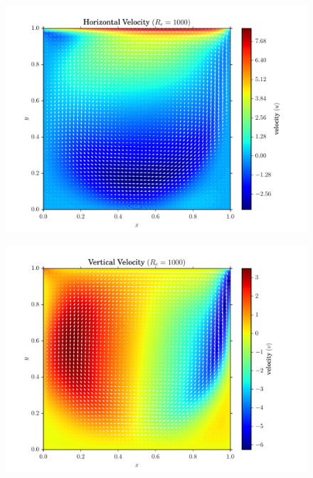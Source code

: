 \documentclass[addpoints]{exam}
\begin{document}
\begin{questions}
\begin{solution}
\begin{figure}[H]
\centering
\begin{minipage}{.45\textwidth}
\centering
\includegraphics[width=\textwidth]{figs/x-velocity_1000.pdf}
\label{fig:x_vel_re1000}
\end{minipage}
\begin{minipage}{.45\textwidth}
\centering
\includegraphics[width=\textwidth]{figs/y-velocity_1000.pdf}
\label{fig:y_vel_re1000}
\end{minipage}
\end{figure}

\end{solution}

\end{questions}

\end{document}
